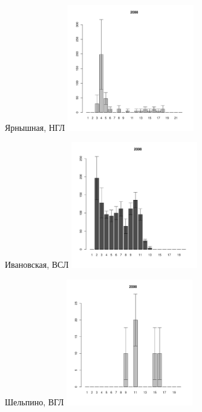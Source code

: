 \begin{figure}[h]
\begin{minipage}[b]{.46\linewidth}
	\begin{center}
	{\footnotesize Ярнышная, НГЛ}
	\includegraphics[width=55mm]{../Barenc_Sea/Yarnyshnaya/low_2008_.pdf}
	\end{center}
	\end{minipage}
	\hfil %
	\begin{minipage}[b]{.46\linewidth}
	\begin{center}	
	{\footnotesize Ивановская, ВСЛ}
	\includegraphics[width=55mm]{../Barenc_Sea/Ivanovskaya/sizestr2008.pdf}
	\end{center}
	\end{minipage}
	\begin{minipage}[b]{.46\linewidth}
	\begin{center}
	{\footnotesize Шельпино, ВГЛ}
	\includegraphics[width=55mm]{../Barenc_Sea/Shel'pino/high_2008_.pdf}
	\end{center}

\end{minipage}
\end{figure}
